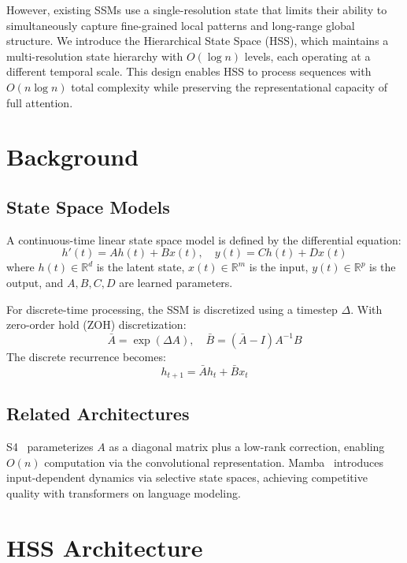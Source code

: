 \documentclass[10pt,twocolumn]{IEEEtran}
\begin{document}
However, existing SSMs use a single-resolution state that
limits their ability to simultaneously capture fine-grained local
patterns and long-range global structure. We introduce the
Hierarchical State Space (HSS), which maintains a multi-resolution
state hierarchy with $O(\log n)$ levels, each operating at a different
temporal scale. This design enables HSS to process sequences with
$O(n \log n)$ total complexity while preserving the representational
capacity of full attention.

\section{Background}

\subsection{State Space Models}

A continuous-time linear state space model is defined by the
differential equation:
\begin{equation}
h'(t) = A h(t) + B x(t), \quad y(t) = C h(t) + D x(t)
\end{equation}
where $h(t) \in \mathbb{R}^d$ is the latent state, $x(t) \in
\mathbb{R}^m$ is the input, $y(t) \in \mathbb{R}^p$ is the output,
and $A, B, C, D$ are learned parameters.

For discrete-time processing, the SSM is discretized using a
timestep $\Delta$. With zero-order hold (ZOH) discretization:
\begin{equation}
\bar{A} = \exp(\Delta A), \quad
\bar{B} = (\bar{A} - I) A^{-1} B
\end{equation}
The discrete recurrence becomes:
\begin{equation}
h_{t+1} = \bar{A} h_t + \bar{B} x_t
\end{equation}

\subsection{Related Architectures}

S4~\cite{gu2021mamba} parameterizes $A$ as a diagonal matrix plus a
low-rank correction, enabling $O(n)$ computation via the
convolutional representation. Mamba~\cite{gu2023mamba} introduces
input-dependent dynamics via selective state spaces, achieving
competitive quality with transformers on language modeling.

\section{HSS Architecture}
\end{document}
